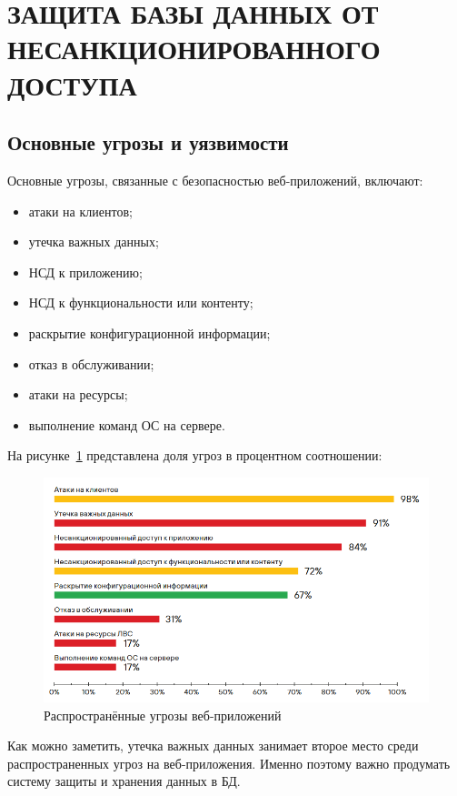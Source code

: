 \section{ЗАЩИТА БАЗЫ ДАННЫХ ОТ НЕСАНКЦИОНИРОВАННОГО ДОСТУПА}

\subsection{Основные угрозы и уязвимости}

Основные угрозы, связанные с безопасностью веб-приложений, включают:

\begin{itemize}
    \item атаки на клиентов;
    \item утечка важных данных;
    \item НСД к приложению;
    \item НСД к функциональности или контенту;
    \item раскрытие конфигурационной информации;
    \item отказ в обслуживании;
    \item атаки на ресурсы;
    \item выполнение команд ОС на сервере.
\end{itemize}

На рисунке~\ref{fig:fig08} представлена доля угроз в процентном соотношении:

\begin{figure}
  \includegraphics[scale=0.745]{inc/threats}
  \caption{Распространённые угрозы веб-приложений}
  \label{fig:fig08}
\end{figure}

Как можно заметить, утечка важных данных занимает второе место среди распространенных угроз на веб-приложения. Именно поэтому важно продумать систему защиты и хранения данных в БД.

